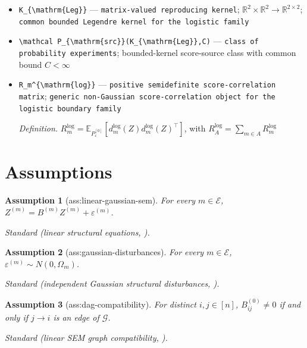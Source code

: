 \documentclass{article}
\newtheorem{assumption}{Assumption}
\begin{document}
\begin{itemize}
  \item \texttt{K\_\allowbreak{}\{\textbackslash{}\allowbreak{}mathrm\{Leg\}\allowbreak{}\}\allowbreak{}} --- \texttt{matrix-\allowbreak{}valued reproducing kernel}; \(\mathbb R^2\times\mathbb R^2\to\mathbb R^{2\times2}\); \texttt{common bounded Legendre kernel for the logistic family}
  \item \texttt{\textbackslash{}\allowbreak{}mathcal P\_\allowbreak{}\{\textbackslash{}\allowbreak{}mathrm\{src\}\allowbreak{}\}\allowbreak{}(K\_\allowbreak{}\{\textbackslash{}\allowbreak{}mathrm\{Leg\}\allowbreak{}\}\allowbreak{},\allowbreak{}C)} --- \texttt{class of probability experiments}; bounded-kernel score-source class with common bound \(C<\infty\)
  \item \texttt{R\_\allowbreak{}m\textasciicircum{}\{\textbackslash{}\allowbreak{}mathrm\{log\}\allowbreak{}\}\allowbreak{}} --- \texttt{positive semidefinite score-\allowbreak{}correlation matrix}; \texttt{generic non-\allowbreak{}Gaussian score-\allowbreak{}correlation object for the logistic boundary family}
  \par\smallskip\noindent\emph{Definition.} \(R_m^{\mathrm{log}}=\mathbb E_{P_{\varepsilon}^{[0]}}[d_m^{\mathrm{log}}(Z)d_m^{\mathrm{log}}(Z)^\top]\), with \(R_A^{\mathrm{log}}=\sum_{m\in A}R_m^{\mathrm{log}}\)
\end{itemize}

\section{Assumptions}

\begin{assumption}[ass:linear-gaussian-sem]\label{ass:linear-gaussian-sem}
For every \(m\in\mathcal E\), \(Z^{(m)}=B^{(m)}Z^{(m)}+\varepsilon^{(m)}\).
\par\smallskip\noindent\emph{Standard} (linear structural equations, \cite{squires2023linear}).
\end{assumption}

\begin{assumption}[ass:gaussian-disturbances]\label{ass:gaussian-disturbances}
For every \(m\in\mathcal E\), \(\varepsilon^{(m)}\sim N(0,\Omega_m)\).
\par\smallskip\noindent\emph{Standard} (independent Gaussian structural disturbances, \cite{squires2023linear}).
\end{assumption}

\begin{assumption}[ass:dag-compatibility]\label{ass:dag-compatibility}
For distinct \(i,j\in[n]\), \(B^{(0)}_{ij}\ne0\) if and only if \(j\to i\) is an edge of \(\mathcal G\).
\par\smallskip\noindent\emph{Standard} (linear SEM graph compatibility, \cite{squires2023linear}).
\end{assumption}
\end{document}
